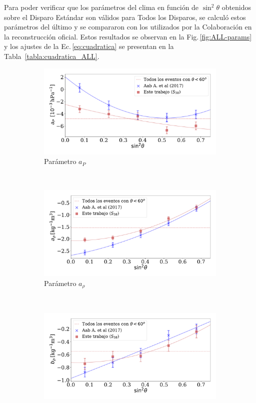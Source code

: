 Para poder verificar que los parámetros del clima en función de $\sin^2\theta$ obtenidos sobre el Disparo Estándar son válidos para Todos los Disparos, se calculó estos parámetros del último y se compararon con los utilizados por la Colaboración en la reconstrucción oficial. Estos resultados se observan en la Fig.\,\ref{fig:ALL-params} y los ajustes de la Ec.\,\ref{eq:cuadratica} se presentan en la Tabla~\ref{tabla:cuadratica_ALL}.   

\begin{figure}[H]
  \centering
  \begin{subfigure}[b]{0.8\textwidth}
  \includegraphics[width=\linewidth]{Graphs/params/ap_AllTriggers.pdf}
  \caption{Parámetro $a_P$ }
  \end{subfigure}\\
  \begin{subfigure}[b]{0.8\textwidth}
  \includegraphics[width=\linewidth]{Graphs/params/arho_AllTriggers.pdf}
  \caption{Parámetro $a_{\rho}$ }
  \end{subfigure}\\
  \begin{subfigure}[b]{\textwidth}
  \centering
  \includegraphics[width=0.8\linewidth]{Graphs/params/brho_AllTriggers.pdf}

\end{subfigure}
\end{figure}

